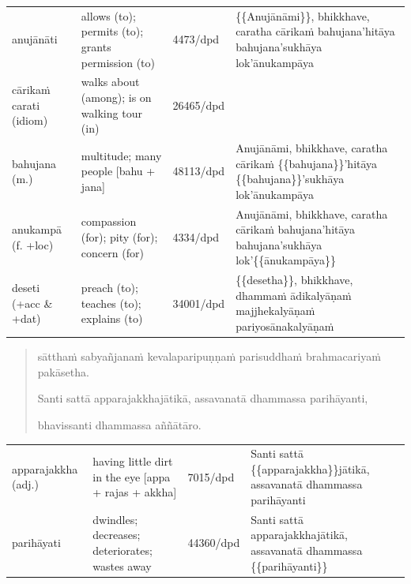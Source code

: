 \documentclass[11pt,oneside]{memoir}
\begin{document}
\vspace*{-1pt}

\begin{longtable}{L{\colOne} L{\colTwo} H H}
anujānāti & allows (to); permits (to); grants permission (to) & 4473/dpd & \{\{Anujānāmi\}\}, bhikkhave, caratha cārikaṁ bahujana'hitāya bahujana'sukhāya lok'ānukampāya\\[0pt]
cārikaṁ carati (idiom) & walks about (among); is on walking tour (in) & 26465/dpd & \\[0pt]
bahujana (m.) & multitude; many people [bahu + jana] & 48113/dpd & Anujānāmi, bhikkhave, caratha cārikaṁ \{\{bahujana\}\}'hitāya \{\{bahujana\}\}'sukhāya lok'ānukampāya\\[0pt]
anukampā (f. +loc) & compassion (for); pity (for); concern (for) & 4334/dpd & Anujānāmi, bhikkhave, caratha cārikaṁ bahujana'hitāya bahujana'sukhāya lok'\{\{ānukampāya\}\}\\[0pt]
deseti  (+acc \& +dat) & preach (to); teaches (to); explains (to) & 34001/dpd & \{\{desetha\}\}, bhikkhave, dhammaṁ ādikalyāṇaṁ majjhekalyāṇaṁ pariyosānakalyāṇaṁ\\[0pt]
\end{longtable}

\clearpage
\casesLegendHeaderBGHere

\begin{quote}
sātthaṁ sabyañjanaṁ kevalaparipuṇṇaṁ parisuddhaṁ brahmacariyaṁ pakāsetha.

Santi sattā apparajakkhajātikā, assavanatā dhammassa parihāyanti,

bhavissanti dhammassa aññātāro.
\end{quote}

\begin{longtable}{L{\colOne} L{\colTwo} H H}
apparajakkha (adj.) & having little dirt in the eye [appa + rajas + akkha] & 7015/dpd & Santi sattā \{\{apparajakkha\}\}jātikā, assavanatā dhammassa parihāyanti\\[0pt]
parihāyati & dwindles; decreases; deteriorates; wastes away & 44360/dpd & Santi sattā apparajakkhajātikā, assavanatā dhammassa \{\{parihāyanti\}\}\\[0pt]
\end{longtable}

\vspace*{-1.5\baselineskip}
\enlargethispage*{2\baselineskip}
\end{document}
